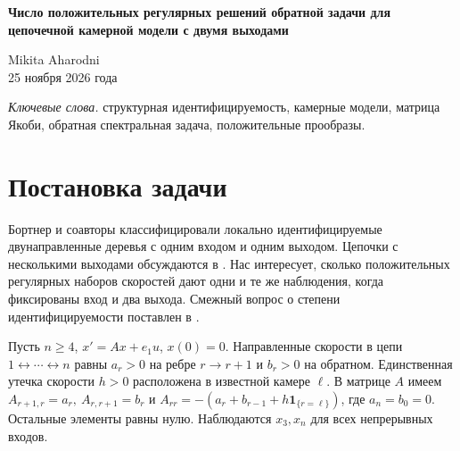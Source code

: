 \documentclass[11pt,a4paper]{article}
\begin{document}
\begin{center}{\Large\bfseries\color{ink} Число положительных регулярных решений обратной задачи для цепочечной камерной модели с двумя выходами\par}\end{center}

\begin{center}Mikita Aharodni\\[2pt]25 ноября 2026 года\end{center}

\begin{abstract}В двунаправленной цепочке из \(n\ge4\) камер вещество вводится в первую камеру, а его количество измеряется в третьей и последней. Место выведения \(\ell\) известно. Максимальное число положительных регулярных наборов скоростей, дающих одни и те же выходные кривые, равно одному при \(\ell=3,n\) и двум при любом другом \(\ell\). Верхнюю оценку даёт вогнутость дистального усиления по спектральным весам матрицы Якоби. Точный пятикамерный пример и две операции удлинения цепочки доказывают достижимость оценки для внутренних камер. При \(n\ge5\) и \(\ell=n-1\) две реализации имеют разные константы выведения \(h\) на непустом открытом множестве данных. Если зафиксировать взаимно простые спектральные многочлены \(D,W\) и первое усиление \(p\), то совпадение \(h\) на двух регулярных ветвях возможно не более чем при одном значении второго усиления \(q\). Такой случай возникает уже при \(n=5\).\end{abstract}

{\small\noindent\textit{Ключевые слова.} структурная идентифицируемость, камерные модели, матрица Якоби, обратная спектральная задача, положительные прообразы.\par}

\section*{\color{ink} Постановка задачи}

Бортнер и соавторы \cite[теорема~5.2]{ref1} классифицировали локально идентифицируемые двунаправленные деревья с одним входом и одним выходом. Цепочки с несколькими выходами обсуждаются в \cite[§6]{ref2}. Нас интересует, сколько положительных регулярных наборов скоростей дают одни и те же наблюдения, когда фиксированы вход и два выхода. Смежный вопрос о степени идентифицируемости поставлен в \cite[вопрос~5.3]{ref3}.

Пусть \(n\ge4\), \(x'=Ax+e_1u\), \(x(0)=0\). Направленные скорости в цепи \(1\leftrightarrow\cdots\leftrightarrow n\) равны \(a_r>0\) на ребре \(r\to r+1\) и \(b_r>0\) на обратном. Единственная утечка скорости \(h>0\) расположена в известной камере \(\ell\). В матрице \(A\) имеем \(A_{r+1,r}=a_r,\ A_{r,r+1}=b_r\) и \(A_{rr}=-(a_r+b_{r-1}+h\mathbf1_{\{r=\ell\}})\), где \(a_n=b_0=0\). Остальные элементы равны нулю. Наблюдаются \(x_3,x_n\) для всех непрерывных входов.
\end{document}
